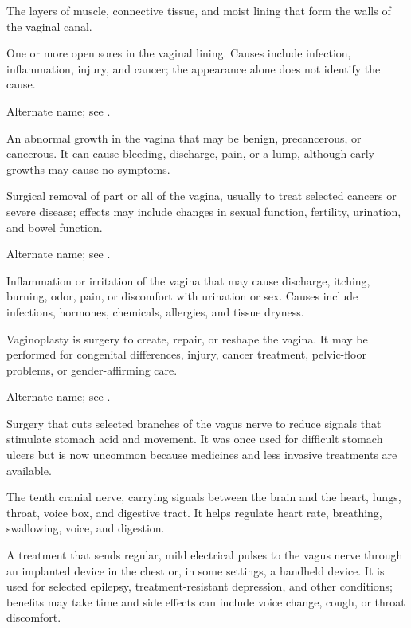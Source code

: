  The layers of muscle, connective tissue, and moist lining that form the walls of the vaginal canal.

 One or more open sores in the vaginal lining. Causes include infection, inflammation, injury, and cancer; the appearance alone does not identify the cause.

 Alternate name; see .

 An abnormal growth in the vagina that may be benign, precancerous, or cancerous. It can cause bleeding, discharge, pain, or a lump, although early growths may cause no symptoms.

 Surgical removal of part or all of the vagina, usually to treat selected cancers or severe disease; effects may include changes in sexual function, fertility, urination, and bowel function.

 Alternate name; see .

 Inflammation or irritation of the vagina that may cause discharge, itching, burning, odor, pain, or discomfort with urination or sex. Causes include infections, hormones, chemicals, allergies, and tissue dryness.

 Vaginoplasty is surgery to create, repair, or reshape the vagina. It may be performed for congenital differences, injury, cancer treatment, pelvic-floor problems, or gender-affirming care.

 Alternate name; see .

 Surgery that cuts selected branches of the vagus nerve to reduce signals that stimulate stomach acid and movement. It was once used for difficult stomach ulcers but is now uncommon because medicines and less invasive treatments are available.

 The tenth cranial nerve, carrying signals between the brain and the heart, lungs, throat, voice box, and digestive tract. It helps regulate heart rate, breathing, swallowing, voice, and digestion.

 A treatment that sends regular, mild electrical pulses to the vagus nerve through an implanted device in the chest or, in some settings, a handheld device. It is used for selected epilepsy, treatment-resistant depression, and other conditions; benefits may take time and side effects can include voice change, cough, or throat discomfort.

